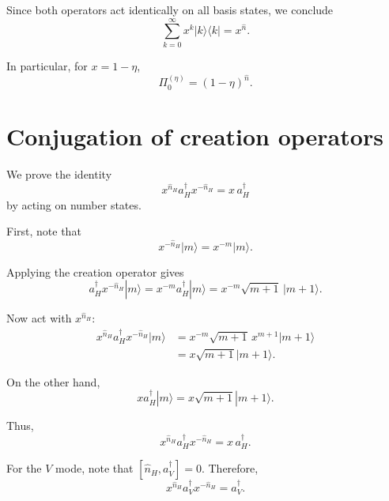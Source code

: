 \documentclass[%
 reprint,
 amsmath,amssymb,
 aps,
twocolumn
]{revtex4-2}
\begin{document}
Since both operators act identically on all basis states, we conclude
\begin{equation}
\boxed{
\sum_{k=0}^{\infty} x^k |k\rangle\langle k| = x^{\hat{n}}.
}
\end{equation}

In particular, for $x = 1-\eta$,
\begin{equation}
\boxed{
\Pi_0^{(\eta)} = (1-\eta)^{\hat{n}}.
}
\end{equation}

\section{Conjugation of creation operators}

We prove the identity
\begin{equation}
x^{\hat n_H} a_H^\dagger x^{-\hat n_H} = x\, a_H^\dagger
\end{equation}
by acting on number states.

First, note that
\begin{equation}\label{eq:x pow n m}
x^{-\hat n_H} |m\rangle = x^{-m} |m\rangle.
\end{equation}

Applying the creation operator gives
\begin{equation}
a_H^\dagger x^{-\hat n_H} |m\rangle
= x^{-m} a_H^\dagger |m\rangle
= x^{-m} \sqrt{m+1}\, |m+1\rangle.
\end{equation}

Now act with $x^{\hat n_H}$:
\begin{align}
x^{\hat n_H} a_H^\dagger x^{-\hat n_H} |m\rangle
&= x^{-m} \sqrt{m+1}\, x^{m+1} |m+1\rangle \\
&= x \sqrt{m+1} |m+1\rangle.
\end{align}

On the other hand,
\begin{equation}
x a_H^\dagger |m\rangle = x \sqrt{m+1} |m+1\rangle.
\end{equation}

Thus,
\begin{equation}\label{eq:x pow n a dagger}
\boxed{
x^{\hat n_H} a_H^\dagger x^{-\hat n_H} = x\, a_H^\dagger.
}
\end{equation}

\medskip

For the $V$ mode, note that $[\hat n_H, a_V^\dagger]=0$. Therefore,
\begin{equation}\label{eq:x pow n a dagger2}
\boxed{
x^{\hat n_H} a_V^\dagger x^{-\hat n_H} = a_V^\dagger.
}
\end{equation}
\end{document}
